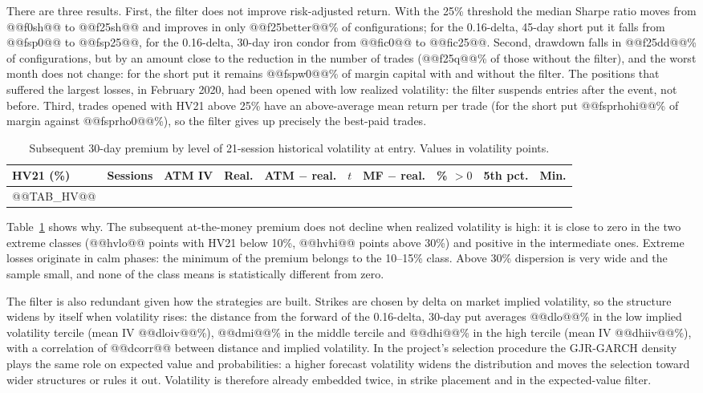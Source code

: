 \documentclass[11pt,a4paper]{article}
\begin{document}
There are three results. First, the filter does not improve risk-adjusted return. With the 25\% threshold the median Sharpe ratio moves from @@f0sh@@ to @@f25sh@@ and improves in only @@f25better@@\% of configurations; for the 0.16-delta, 45-day short put it falls from @@fsp0@@ to @@fsp25@@, for the 0.16-delta, 30-day iron condor from @@fic0@@ to @@fic25@@. Second, drawdown falls in @@f25dd@@\% of configurations, but by an amount close to the reduction in the number of trades (@@f25q@@\% of those without the filter), and the worst month does not change: for the short put it remains @@fspw0@@\% of margin capital with and without the filter. The positions that suffered the largest losses, in February 2020, had been opened with low realized volatility: the filter suspends entries after the event, not before. Third, trades opened with HV21 above 25\% have an above-average mean return per trade (for the short put @@fsprhohi@@\% of margin against @@fsprho0@@\%), so the filter gives up precisely the best-paid trades.

\begin{table}[ht]\centering\small
\caption{Subsequent 30-day premium by level of 21-session historical volatility at entry. Values in volatility points.}\label{tab:hv}
\begin{tabular}{lrrrrrrrrr}\toprule
HV21 (\%) & Sessions & ATM IV & Real. & ATM $-$ real. & $t$ & MF $-$ real. & \% $>0$ & 5th pct. & Min. \\ \midrule
@@TAB_HV@@
\bottomrule\end{tabular}\end{table}

Table~\ref{tab:hv} shows why. The subsequent at-the-money premium does not decline when realized volatility is high: it is close to zero in the two extreme classes (@@hvlo@@ points with HV21 below 10\%, @@hvhi@@ points above 30\%) and positive in the intermediate ones. Extreme losses originate in calm phases: the minimum of the premium belongs to the 10--15\% class. Above 30\% dispersion is very wide and the sample small, and none of the class means is statistically different from zero.

The filter is also redundant given how the strategies are built. Strikes are chosen by delta on market implied volatility, so the structure widens by itself when volatility rises: the distance from the forward of the 0.16-delta, 30-day put averages @@dlo@@\% in the low implied volatility tercile (mean IV @@dloiv@@\%), @@dmi@@\% in the middle tercile and @@dhi@@\% in the high tercile (mean IV @@dhiiv@@\%), with a correlation of @@dcorr@@ between distance and implied volatility. In the project's selection procedure the GJR-GARCH density plays the same role on expected value and probabilities: a higher forecast volatility widens the distribution and moves the selection toward wider structures or rules it out. Volatility is therefore already embedded twice, in strike placement and in the expected-value filter.
\end{document}

